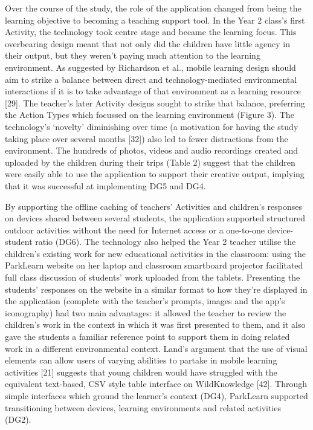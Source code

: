 Over the course of the study, the role of the application changed from being the
learning objective to becoming a teaching support tool. In the Year 2 class’s
first Activity, the technology took centre stage and became the learning focus.
This overbearing design meant that not only did the children have little agency
in their output, but they weren’t paying much attention to the learning
environment. As suggested by Richardson et al., mobile learning design should
aim to strike a balance between direct and technology-mediated environmental
interactions if it is to take advantage of that environment as a learning
resource [29]. The teacher’s later Activity designs sought to strike that
balance, preferring the Action Types which focussed on the learning environment
(Figure 3). The technology’s ‘novelty’ diminishing over time (a motivation for
having the study taking place over several months [32]) also led to fewer
distractions from the environment. The hundreds of photos, videos and audio
recordings created and uploaded by the children during their trips (Table 2)
suggest that the children were easily able to use the application to support
their creative output, implying that it was successful at implementing DG5 and
DG4.

By supporting the offline caching of teachers’ Activities and children’s
responses on devices shared between several students, the application supported
structured outdoor activities without the need for Internet access or a
one-to-one device-student ratio (DG6). The technology also helped the Year 2
teacher utilise the children’s existing work for new educational activities in
the classroom: using the ParkLearn website on her laptop and classroom
smartboard projector facilitated full class discussion of students’ work
uploaded from the tablets. Presenting the students’ responses on the website in
a similar format to how they’re displayed in the application (complete with the
teacher’s prompts, images and the app’s iconography) had two main advantages: it
allowed the teacher to review the children’s work in the context in which it was
first presented to them, and it also gave the students a familiar reference
point to support them in doing related work in a different environmental
context. Land’s argument that the use of visual elements can allow users of
varying abilities to partake in mobile learning activities [21] suggests that
young children would have struggled with the equivalent text-based, CSV style
table interface on WildKnowledge [42]. Through simple interfaces which ground
the learner’s context (DG4), ParkLearn supported transitioning between devices,
learning environments and related activities (DG2).

